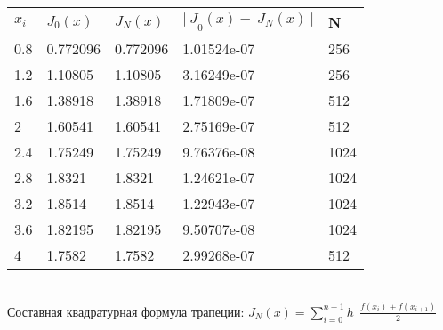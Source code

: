 \documentclass[12pt,a4paper]{report}
\begin{document}
{	\begin{center}
		\begin{tabular}{ | l | l | l | l | l | }
			\hline
			$x_i$	& $J_0(x)$	& $J_N(x)$	& ${|\ J}_0\left(x\right)-\ J_N\left(x\right)\ |$	& N\\
			\hline                       
			0.8 	& 0.772096	& 0.772096	& 1.01524e-07                                 		& 256\\
			\hline
			1.2 	& 1.10805	& 1.10805	& 3.16249e-07	                                 	& 256\\
			\hline
			1.6 	& 1.38918	& 1.38918	& 1.71809e-07	                                 	& 512\\
			\hline
			2   	& 1.60541	& 1.60541	& 2.75169e-07	                                 	& 512\\
			\hline
			2.4 	& 1.75249	& 1.75249	& 9.76376e-08	                                 	& 1024\\
			\hline
			2.8 	& 1.8321	& 1.8321	& 1.24621e-07	                                 	& 1024\\
			\hline
			3.2 	& 1.8514	& 1.8514	& 1.22943e-07	                                 	& 1024\\
			\hline
			3.6 	& 1.82195	& 1.82195	& 9.50707e-08	                                 	& 1024\\
			\hline
			4   	& 1.7582	& 1.7582	& 2.99268e-07	                                 	& 512\\
			\hline
		\end{tabular}
	\end{center}
	
	\noindent \\Составная квадратурная формула трапеции:
	\newline
	 $J_N\left(x\right)=\displaystyle\sum_{i=0}^{n-1}h\ \ \frac{f\left(x_i\right)+f\left(x_{i+1}\right)}{2}$\\
	
}
\end{document}
